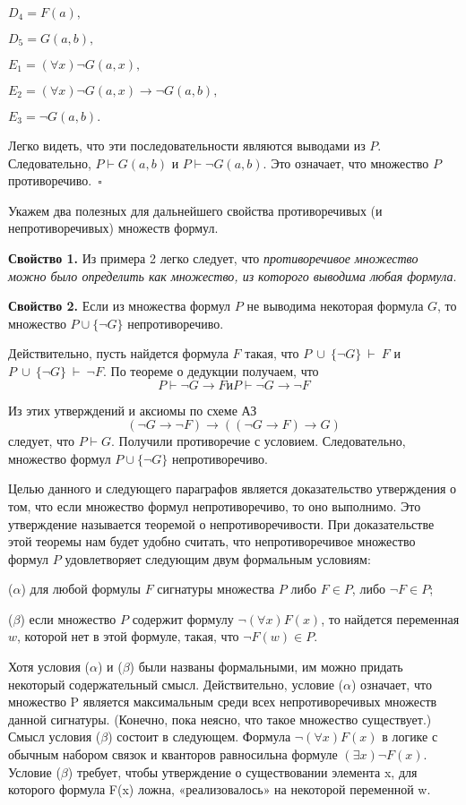 \documentclass[a4paper]{article}
\begin{document}
$D_4 = F(a),$

$D_5 = G(a ,b),$

$E_1 = (\forall x) \neg G(a, x),$

$E_2 = (\forall x) \neg G(a, x) \rightarrow \neg G(a, b),$

$E_3 = \neg G(a, b).$

Легко видеть, что эти последовательности являются выводами из $P$. Следовательно, $P \vdash G(a, b)$ и $P \vdash \neg G(a, b)$. Это означает, что множество $P$ противоречиво.\ $\square$


Укажем два полезных для дальнейшего свойства противоречивых (и непротиворечивых) множеств формул.

\textbf {Свойство 1.} Из примера 2 легко следует, что \textit{противоречивое множество можно было определить как множество, из которого выводима любая формула}.

\textbf{Свойство 2.} Если из множества формул $P$ не выводима некоторая формула $G$,  то множество $P \cup \{\neg G\}$ непротиворечиво.

Действительно, пусть найдется формула $F$ такая, что $P~\cup~\{ \neg G\}~\vdash~F$ и $P~\cup~\{ \neg G \}~\vdash~\neg F$. По теореме о дедукции получаем, что 
$$
P \vdash \neg G \rightarrow F и P \vdash \neg G \rightarrow \neg F
$$

Из этих утверждений и аксиомы по схеме АЗ $$(\neg G \rightarrow \neg F)\rightarrow ((\neg G \rightarrow F) \rightarrow G)$$ следует, что $P \vdash G$. Получили противоречие с условием. Следовательно, множество формул $P \cup \{\neg G\}$ непротиворечиво.

Целью данного и следующего параграфов является доказательство утверждения о том, что если множество формул непротиворечиво, то оно выполнимо. Это утверждение называется
теоремой о непротиворечивости. При доказательстве этой теоремы нам будет удобно считать, что непротиворечивое множество формул $P$ удовлетворяет следующим двум формальным условиям:

($\alpha$) для любой формулы $F$ сигнатуры множества $P$ либо $F \in P$, либо $\neg F \in P$; 

($\beta$) если множество $P$ содержит формулу $\neg(\forall x)F(x)$, то найдется переменная $w$, которой нет в этой формуле, такая, что $\neg F(w) \in P$.

Хотя условия ($\alpha$) и ($\beta$) были названы формальными, им можно придать некоторый содержательный смысл. Действительно, условие ($\alpha$) означает, что множество P является максимальным среди всех непротиворечивых множеств данной сигнатуры. (Конечно, пока неясно, что такое множество существует.) Смысл условия ($\beta$) состоит в следующем. Формула $\neg (\forall x)F(x)$ в логике с обычным набором связок и кванторов равносильна формуле $(\exists x)\neg F(x)$. Условие ($\beta$) требует, чтобы утверждение о  существовании элемента x, для которого формула F(x) ложна, «реализовалось» на некоторой переменной w.  
\end{document}
